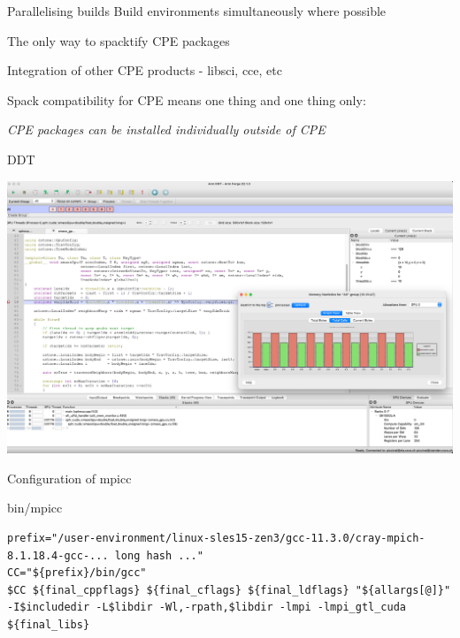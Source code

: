\documentclass[aspectratio=43]{beamer}
\begin{document}


\begin{frame}[fragile]{Parallelising builds}
    Build environments simultaneously where possible
    \begin{center}
        
    \end{center}
\end{frame}

\begin{frame}[fragile]{The only way to spacktify CPE packages}
    \begin{center}
    Integration of other CPE products - libsci, cce, etc

    \vspace{20pt}

    Spack compatibility for CPE means one thing and one thing only:

    \vspace{20pt}

    \emph{CPE packages can be installed individually outside of CPE}

    \end{center}
\end{frame}
\begin{frame}[fragile]{DDT}
    \begin{center}
        \includegraphics[width=\textwidth]{images/sph-ddt-uenv.png}
    \end{center}
\end{frame}

\begin{frame}[fragile]{Configuration of mpicc}
\begin{code}{bin/mpicc}
    \begin{lstlisting}[style=talkbash]
prefix="/user-environment/linux-sles15-zen3/gcc-11.3.0/cray-mpich-8.1.18.4-gcc-... long hash ..."
CC="${prefix}/bin/gcc"
$CC ${final_cppflags} ${final_cflags} ${final_ldflags} "${allargs[@]}" -I$includedir -L$libdir -Wl,-rpath,$libdir -lmpi -lmpi_gtl_cuda ${final_libs} \end{lstlisting}
\end{code}

\end{frame}
\end{document}
